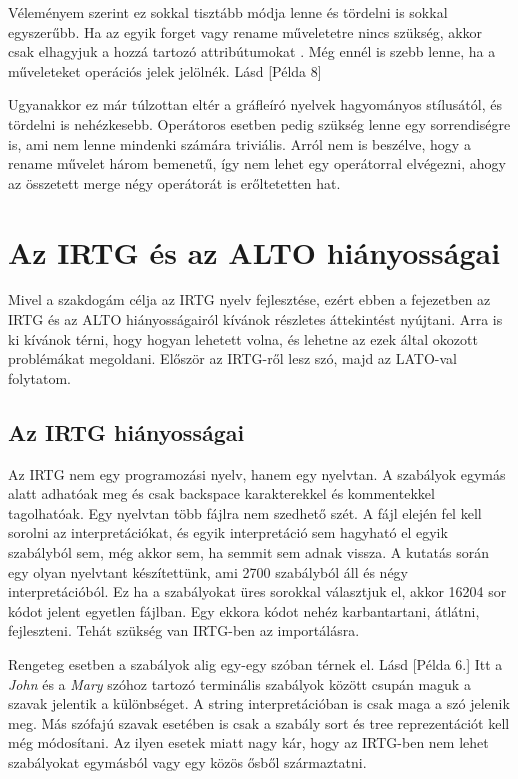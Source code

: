 Véleményem szerint ez sokkal tisztább módja lenne és tördelni is sokkal egyszerűbb. Ha az egyik forget vagy rename műveletetre nincs szükség, akkor csak elhagyjuk a hozzá tartozó attribútumokat . Még ennél is szebb lenne, ha a műveleteket operációs jelek jelölnék. Lásd [Példa 8]

Ugyanakkor ez már túlzottan eltér a gráfleíró nyelvek hagyományos stílusától, és tördelni is nehézkesebb. Operátoros esetben pedig szükség lenne egy sorrendiségre is, ami nem lenne mindenki számára triviális. Arról nem is beszélve, hogy a rename művelet három bemenetű, így nem lehet egy operátorral elvégezni, ahogy az összetett merge négy operátorát is erőltetetten hat.


\section{Az IRTG és az ALTO hiányosságai}
Mivel a szakdogám célja az IRTG nyelv fejlesztése, ezért ebben a fejezetben az IRTG és az ALTO hiányosságairól kívánok részletes áttekintést nyújtani.
Arra is ki kívánok térni, hogy hogyan lehetett volna, és lehetne az ezek által okozott problémákat megoldani.
Először az IRTG-ről lesz szó, majd az LATO-val folytatom.

\subsection{Az IRTG hiányosságai}

Az IRTG nem egy programozási nyelv, hanem egy nyelvtan. A szabályok egymás alatt adhatóak meg és csak backspace karakterekkel és kommentekkel tagolhatóak. Egy nyelvtan több fájlra nem szedhető szét. A fájl elején fel kell sorolni az interpretációkat, és egyik interpretáció sem hagyható el egyik szabályból sem, még akkor sem, ha semmit sem adnak vissza. A kutatás során egy olyan nyelvtant készítettünk, ami 2700 szabályból áll és négy interpretációból. Ez ha a szabályokat üres sorokkal választjuk el, akkor 16204 sor kódot jelent egyetlen fájlban. Egy ekkora kódot nehéz karbantartani, átlátni, fejleszteni. Tehát szükség van IRTG-ben az importálásra.


Rengeteg esetben a szabályok alig egy-egy szóban térnek el. Lásd [Példa 6.]
Itt a \textit{John} és a \textit{Mary} szóhoz tartozó terminális szabályok között csupán maguk a szavak jelentik a különbséget. A string interpretációban is csak maga a szó jelenik meg. Más szófajú szavak esetében is csak a szabály sort és tree reprezentációt kell még módosítani. Az ilyen esetek miatt nagy kár, hogy az IRTG-ben nem lehet szabályokat egymásból vagy egy közös ősből származtatni.


